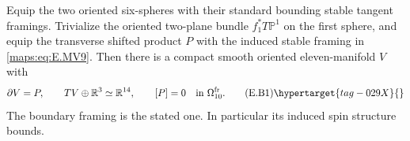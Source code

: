 \begin{proposition}\hypertarget{tag-02MS}{}\label{maps:src:E.2.8}


Equip the two oriented six-spheres with their standard bounding
stable tangent framings. Trivialize the oriented two-plane bundle
$f_1^*T\mathbb P^1$ on the first sphere, and equip the transverse
shifted product $P$ with the induced stable framing in \eqref{maps:eq:E.MV9}.
Then there is a compact smooth oriented eleven-manifold $V$ with
\[
 \partial V=P,\qquad TV\oplus\mathbb R^3\simeq\mathbb R^{14},
 \qquad [P]=0\quad\hbox{in }\Omega^{\mathrm{fr}}_{10}.
 \tag{E.B1}\hypertarget{tag-029X}{}\label{maps:eq:E.B1}
\]
The boundary framing is the stated one. In particular its induced
spin structure bounds. 
\end{proposition}


